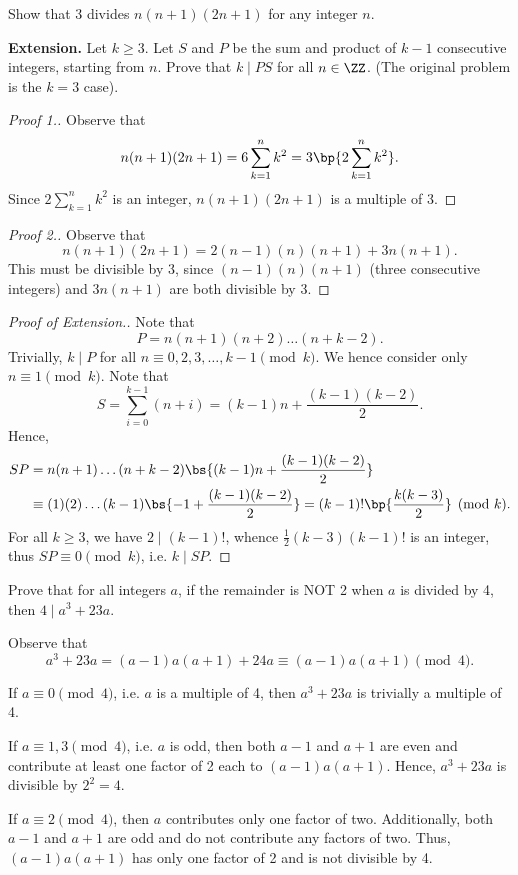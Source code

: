 \clearpage
\begin{problem}
    Show that 3 divides $n(n+1)(2n+1)$ for any integer $n$.

    \noindent\textbf{Extension.} Let $k \geq 3$. Let $S$ and $P$ be the sum and product of $k-1$ consecutive integers, starting from $n$. Prove that $k \mid PS$ for all $n \in \ZZ$. (The original problem is the $k = 3$ case).
\end{problem}
\begin{proof}[Proof 1.]
    Observe that \[n(n+1)(2n+1) = 6 \sum_{k = 1}^n k^2 = 3\bp{2\sum_{k = 1}^n k^2}.\] Since $2\sum_{k = 1}^n k^2$ is an integer, $n(n+1)(2n+1)$ is a multiple of 3.
\end{proof}
\begin{proof}[Proof 2.]
    Observe that \[n(n+1)(2n+1) = 2(n-1)(n)(n+1) + 3n(n+1).\] This must be divisible by 3, since $(n-1)(n)(n+1)$ (three consecutive integers) and $3n(n+1)$ are both divisible by 3.
\end{proof}
\begin{proof}[Proof of Extension.]
    Note that \[P = n(n+1)(n+2)\dots(n+k-2).\] Trivially, $k \mid P$ for all $n \equiv 0, 2, 3, \dots, k-1 \pmod{k}$. We hence consider only $n \equiv 1 \pmod{k}$. Note that \[S = \sum_{i = 0}^{k-1} (n + i) = (k-1)n + \frac{(k-1)(k-2)}{2}.\] Hence,
    \begin{align*}
        SP &= n(n+1)\dots(n+k-2) \bs{(k-1)n + \frac{(k-1)(k-2)}{2}}\\
        &\equiv (1)(2)\dots(k-1) \bs{-1 + \frac{(k-1)(k-2)}{2}} = (k-1)! \bp{\frac{k(k-3)}{2}} \pmod{k}.
    \end{align*}
    For all $k \geq 3$, we have $2 \mid (k-1)!$, whence $\frac12 (k-3) (k-1)!$ is an integer, thus $SP \equiv 0 \pmod{k}$, i.e. $k \mid SP$.
\end{proof}

\begin{problem}
    Prove that for all integers $a$, if the remainder is NOT 2 when $a$ is divided by 4, then $4 \mid a^3 + 23 a$.
\end{problem}
\begin{solution}
    Observe that \[a^3 + 23 a = (a-1)a(a+1) + 24a \equiv (a-1)a(a+1) \pmod{4}.\]

     If $a \equiv 0 \pmod{4}$, i.e. $a$ is a multiple of 4, then $a^3 + 23a$ is trivially a multiple of 4.

     If $a \equiv 1, 3 \pmod{4}$, i.e. $a$ is odd, then both $a-1$ and $a+1$ are even and contribute at least one factor of 2 each to $(a-1)a(a+1)$. Hence, $a^3 + 23a$ is divisible by $2^2 = 4$.
    
     If $a \equiv 2 \pmod{4}$, then $a$ contributes only one factor of two. Additionally, both $a-1$ and $a+1$ are odd and do not contribute any factors of two. Thus, $(a-1)a(a+1)$ has only one factor of 2 and is not divisible by 4.
\end{solution}

